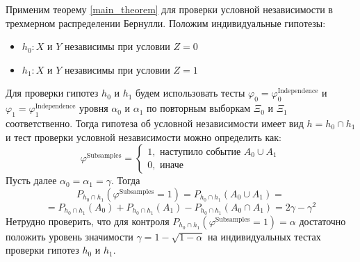 Применим теорему \ref{main_theorem} для проверки условной независимости в трехмерном
распределении Бернулли.
Положим индивидуальные гипотезы:
\begin{itemize}
    \item $h_0 : X$ и $Y$ независимы при условии $Z=0$
    \item $h_1 : X$ и $Y$ независимы при условии $Z=1$
\end{itemize}
Для проверки гипотез $h_0$ и $h_1$ будем использовать тесты
$\varphi_0 = \varphi^{\text{Independence}}_0$ и 
$\varphi_1 = \varphi^{\text{Independence}}_1$ уровня $\alpha_0$ и $\alpha_1$ 
по повторным выборкам
$\Xi_0$ и $\Xi_1$ соответственно.
Тогда гипотеза
об условной независимости имеет вид $h = h_0 \cap h_1$ и тест проверки условной независимости можно определить как:
$$
\varphi^{\text{Subsamples}}=\begin{cases}
    1, \text{ наступило событие $A_0 \cup A_1$}\\
    0, \text{ иначе}
\end{cases}
$$
Пусть далее $\alpha_0 = \alpha_1 = \gamma$.
Тогда $$P_{h_0 \cap h_1}(\varphi^{\text{Subsamples}}=1)=P_{h_0 \cap h_1}(A_0 \cup A_1)=$$ 
$$ = P_{h_0 \cap h_1}(A_0) + P_{h_0 \cap h_1}(A_1) - 
P_{h_0 \cap h_1}(A_0 \cap A_1) = 2\gamma - \gamma^2$$
Нетрудно проверить, что для контроля $P_{h_0 \cap h_1}(\varphi^{\text{Subsamples}}=1)=\alpha$ достаточно положить
уровень значимости $\gamma = 1 - \sqrt{1-\alpha}$ на индивидуальных
тестах проверки гипотез $h_0$ и $h_1$.
